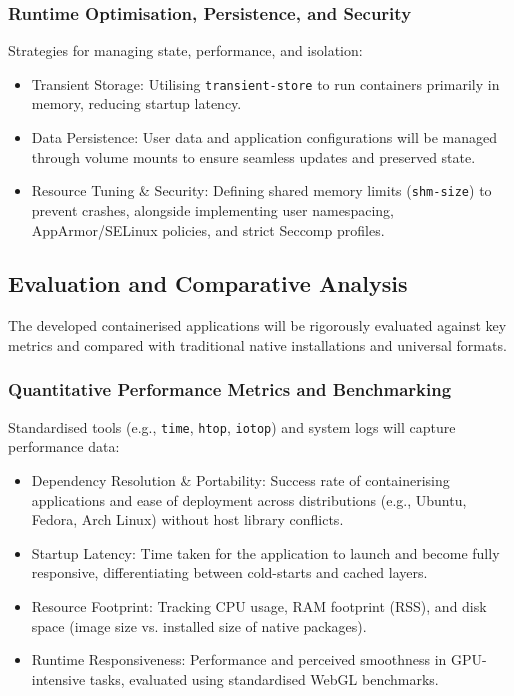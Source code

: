 \documentclass[journal,onecolumn]{IEEEtran}
\newcommand{\code}[1]{\texttt{#1}}
\begin{document}
\subsubsection{Runtime Optimisation, Persistence, and Security}
Strategies for managing state, performance, and isolation:
\begin{itemize}
    \item Transient Storage: Utilising \code{transient-store} to run containers primarily in memory, reducing startup latency.
    \item Data Persistence: User data and application configurations will be managed through volume mounts to ensure seamless updates and preserved state.
    \item Resource Tuning \& Security: Defining shared memory limits (\code{shm-size}) to prevent crashes, alongside implementing user namespacing, AppArmor/SELinux policies, and strict Seccomp profiles.
\end{itemize}

\subsection{Evaluation and Comparative Analysis}
The developed containerised applications will be rigorously evaluated against key metrics and compared with traditional native installations and universal formats.

\subsubsection{Quantitative Performance Metrics and Benchmarking}
Standardised tools (e.g., \texttt{time}, \texttt{htop}, \texttt{iotop}) and system logs will capture performance data:
\begin{itemize}
    \item Dependency Resolution \& Portability: Success rate of containerising applications and ease of deployment across distributions (e.g., Ubuntu, Fedora, Arch Linux) without host library conflicts.
    \item Startup Latency: Time taken for the application to launch and become fully responsive, differentiating between cold-starts and cached layers.
    \item Resource Footprint: Tracking CPU usage, RAM footprint (RSS), and disk space (image size vs. installed size of native packages).
    \item Runtime Responsiveness: Performance and perceived smoothness in GPU-intensive tasks, evaluated using standardised WebGL benchmarks.
\end{itemize}
\end{document}
